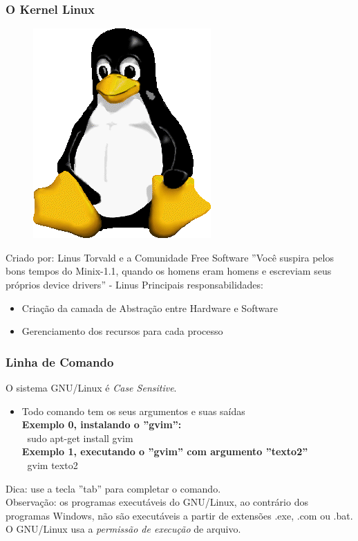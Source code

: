 \documentclass{beamer}
\begin{document}
\begin{frame}
    \frametitle{O Kernel Linux}
    
    \begin{figure}
        \includegraphics[width=.1\linewidth]{logo.png}
    \end{figure}


    Criado por: Linus Torvald e a Comunidade Free Software
    \newline
    \newline
    ''Você suspira pelos bons tempos do Minix-1.1, quando os homens eram homens e escreviam seus próprios device drivers'' - Linus
        Principais responsabilidades:
    \begin{itemize}
        \item Criação da camada de Abstração entre Hardware e Software
        \item Gerenciamento dos recursos para cada processo
    \end{itemize}
\end{frame}

\begin{frame}   
    \frametitle{Linha de Comando}

    O sistema GNU/Linux é \textit{Case Sensitive}.

    \begin{itemize}
        \item Todo comando tem os seus argumentos e suas saídas\\
            \textbf{Exemplo 0, instalando o ''gvim'':}\\
            $\>$ sudo apt-get install gvim\\
            \textbf{Exemplo 1, executando o ''gvim'' com argumento ''texto2'' }\\
            $\>$ gvim texto2 \\
    \end{itemize}

    Dica: use a tecla ''tab'' para completar o comando.\\
    Observação: os programas executáveis do GNU/Linux, ao contrário dos programas
    Windows, não são executáveis a partir de extensões .exe, .com ou .bat. O GNU/Linux
    usa a \textit{permissão de execução} de arquivo.

\end{frame}
\end{document}
